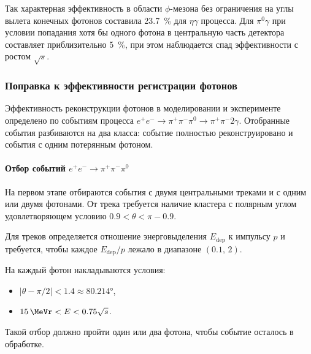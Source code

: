Так характерная эффективность в области $\phi$-мезона без ограничения на углы вылета конечных
фотонов составила \SI{23.7}{\percent} для $\eta \gamma$ процесса.
Для $\pi^0 \gamma$ при условии попадания хотя бы одного фотона в центральную часть детектора
составляет приблизительно \SI{5}{\percent},
при этом наблюдается спад эффективности с ростом $\sqrt{s}$.



\subsubsection{Поправка к эффективности регистрации фотонов}



Эффективность реконструкции фотонов в моделировании и эксперименте определено по событиям процесса
$e^+ e^- \to \pi^+ \pi^- \pi^0 \to \pi^+ \pi^- 2 \gamma$.
Отобранные события разбиваются на два класса:
событие полностью реконструировано и
события с одним потерянным фотоном.


\paragraph{Отбор событий $e^+ e^- \to \pi^+ \pi^- \pi^0$}

На первом этапе отбираются события с двумя центральными треками и с одним или двумя фотонами.
От трека требуется наличие кластера с полярным углом удовлетворяющем условию $0.9 < \theta < \pi - 0.9$.

Для треков определяется отношение энерговыделения $E_{\text{dep}}$ к импульсу $p$ и
требуется,
чтобы каждое $E_{\text{dep}} / p$ лежало в диапазоне $(0.1, \, 2)$.

На каждый фотон накладываются условия:
\begin{itemize}
    \item $| \theta - \pi/2| < 1.4 \approx \ang{80.214}$,
    \item $\SI{15}{\MeVr} < E < 0.75 \sqrt{s}$.
\end{itemize}
Такой отбор должно пройти один или два фотона, чтобы событие осталось в обработке.

